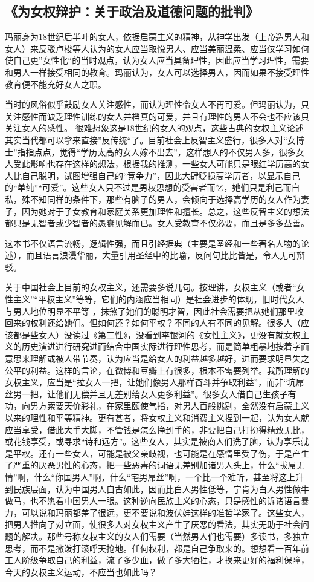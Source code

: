 \subsection{《为女权辩护：关于政治及道德问题的批判》}
玛丽身为18世纪后半叶的女人，依据启蒙主义的精神，从神学出发（上帝造男人和女人）来反驳卢梭等人认为的女人应当取悦男人、应当美丽温柔、应当仅学习如何使自己更”女性化“的当时观点，认为女人应当具备理性，因此应当学习理性，需要和男人一样接受相同的教育。玛丽认为，女人可以选择男人，因而如果不接受理性教育便不能充好女人之职。
 
当时的风俗似乎鼓励女人关注感性，而认为理性令女人不再可爱。但玛丽认为，只关注感性而缺乏理性训练的女人并档真的可爱，并且有理性的男人不会也不应该只关注女人的感性。 
很难想象这是18世纪的女人的观点，这些古典的女权主义论述其实当代都可以拿来直接”反传统“了。目前社会上反智主义盛行，很多人对“女博士”指指点点，觉得“学历太高的女人嫁不出去”，这样想人的不仅男人多，很多女人受此影响也存在这样的想法，根据我的推测，一些女人可能只是眼红学历高的女人比自己聪明，试图增强自己的“竞争力”，因此大肆贬损高学历者，以显示自己的“单纯”“可爱”。这些女人只不过是男权思想的受害者而忆，她们只是利己而自私，殊不知同样的条件下，那些有脑子的男人，会倾向于选择高学历的女人作为妻子，因为她对于子女教育和家庭关系更加理性和擅长。总之，这些反智主义的想法都只是无智者或少智者的愚蠢见解而已。女人受教育不仅必要，而且是多多益善。 

这本书不仅语言流畅，逻辑性强，而且引经据典（主要是圣经和一些著名人物的论述），而且语言浪漫华丽，大量引用圣经中的比喻，反问句比比皆是，令人无可辩驳。

关于中国社会上目前的女权主义，还需要多说几句。按理讲，女权主义（或者“女性主义”“平权主义”等等，它们的内涵应当相同）是社会进步的体现，旧时代女人与男人地位明显不平等 ，抹煞了她们的聪明才智，因此社会需要把从她们那里收回来的权利还给她们。但如何还？如何平权？不同的人有不同的见解。很多人（应该都是些女人）没读过《第二性》，没看到李银河的《女性主义》，更没有就女权主义的历史演进进行研究进而结合中国实际进行理性思考，而是简单粗暴地按着字面意思来理解或被人带节奏，认为应当是给女人的利益越多越好，进而要求明显失之公平的利益。这样的言论，在微博和豆瓣上有很多，根本不需要列举。我所理解的女权主义，应当是“拉女人一把，让她们像男人那样奋斗并争取利益”，而非“坑屌丝男一把，让他们无偿并且无差别给女人更多利益”。很多女人借自己生孩子有功，向男方索要天价彩礼，在家里颐使气指，对男人百般挑剔，全然没有启蒙主义以来的理性和平等精神。更有甚者，将女权主义和消费主义捏到一起，认为女人就应当享受，借此大手大脚，不管钱是怎么挣到手的，非要把自己打扮得精致无比，或花钱享受，或寻求“诗和远方”。这些女人，其实是被商人们洗了脑，认为享乐就是平权。还有一些女人，可能是被父亲歧视，也可能是在感情里受了伤，于是产生了严重的厌恶男性的心态，把一些恶毒的词语无差别加诸男人头上，什么“拔屌无情”啊，什么“你国男人”啊，什么“宅男屌丝”啊，一个比一个难听，甚至将这上升到民族层面，认为中国男人自古如此，因而比白人男性低等，宁肯为白人男性做牛做马，也不愿看中国男人一眼。这种逆向民族主义的心态，只是感性的诉诸语言暴力，可以说和玛丽都差了很远，更不要说和波伏娃这样的准哲学家了。这些女人，把男人推向了对立面，使很多人对女权主义产生了厌恶的看法，其实无助于社会问题的解决。那些号称女权主义的女人们需要（当然男人们也需要）多读书，多独立思考，而不是撒泼打滚呼天抢地。任何权利，都是自己争取来的。想想看一百年前工人阶级争取自己的利益，流了多少血，做了多大牺牲，才换来更好的福利保障，今天的女权主义运动，不应当也如此吗？

